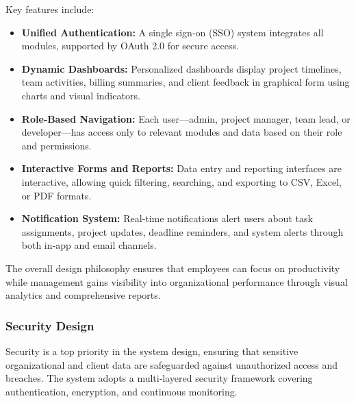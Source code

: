 \documentclass[12pt,a4paper]{article}
\begin{document}
Key features include:
\begin{itemize}
    \item \textbf{Unified Authentication:} A single sign‑on (SSO) system integrates all modules, supported by OAuth 2.0 for secure access.
    
    \item \textbf{Dynamic Dashboards:} Personalized dashboards display project timelines, team activities, billing summaries, and client feedback in graphical form using charts and visual indicators.
    
    \item \textbf{Role‑Based Navigation:} Each user—admin, project manager, team lead, or developer—has access only to relevant modules and data based on their role and permissions.
    
    \item \textbf{Interactive Forms and Reports:} Data entry and reporting interfaces are interactive, allowing quick filtering, searching, and exporting to CSV, Excel, or PDF formats.
    
    \item \textbf{Notification System:} Real‑time notifications alert users about task assignments, project updates, deadline reminders, and system alerts through both in‑app and email channels.
\end{itemize}

The overall design philosophy ensures that employees can focus on productivity while management gains visibility into organizational performance through visual analytics and comprehensive reports.

\subsubsection{Security Design}
Security is a top priority in the system design, ensuring that sensitive organizational and client data are safeguarded against unauthorized access and breaches.  The system adopts a multi‑layered security framework covering authentication, encryption, and continuous monitoring.
\end{document}
